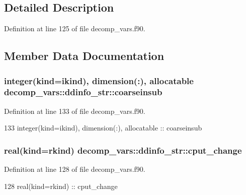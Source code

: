 \subsection{Detailed Description}


Definition at line 125 of file decomp\+\_\+vars.\+f90.



\subsection{Member Data Documentation}
\subsubsection[{coarseinsub}]{\setlength{\rightskip}{0pt plus 5cm}integer(kind=ikind), dimension(\+:), allocatable decomp\+\_\+vars\+::ddinfo\+\_\+str\+::coarseinsub\hspace{0.3cm}{\ttfamily [private]}}\label{structdecomp__vars_1_1ddinfo__str_aaf5a560aab637b4e424dfcf185a69805}


Definition at line 133 of file decomp\+\_\+vars.\+f90.


\begin{DoxyCode}
133     \textcolor{keywordtype}{integer(kind=ikind)}, \textcolor{keywordtype}{dimension(:)}, \textcolor{keywordtype}{allocatable} :: coarseinsub
\end{DoxyCode}
\subsubsection[{cput\+\_\+change}]{\setlength{\rightskip}{0pt plus 5cm}real(kind=rkind) decomp\+\_\+vars\+::ddinfo\+\_\+str\+::cput\+\_\+change\hspace{0.3cm}{\ttfamily [private]}}\label{structdecomp__vars_1_1ddinfo__str_aa16b4ffe83bcecc64d681fa3609e5358}


Definition at line 128 of file decomp\+\_\+vars.\+f90.


\begin{DoxyCode}
128     \textcolor{keywordtype}{real(kind=rkind)} :: cput\_change
\end{DoxyCode}
